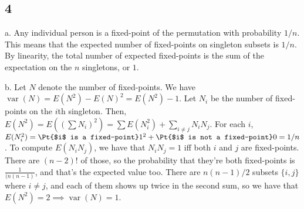 \documentclass{article}
\DeclareMathOperator{\var}{var}
\begin{document}
%
\subsection*{4}
a. Any individual person is a fixed-point of the permutation with probability $1/n$. This means that the expected number of fixed-points on singleton subsets is $1/n$. By linearity, the total number of expected fixed-points is the sum of the expectation on the $n$ singletons, or $1$.

b. Let $N$ denote the number of fixed-points. We have $\var(N)=E(N^2)-E(N)^2=E(N^2)-1$. Let $N_i$ be the number of fixed-points on the $i$th singleton. Then, $E(N^2)=E((\sum N_i)^2)=\sum E(N_i^2)+\sum_{i\neq j}N_iN_j$. For each $i$, $E(N_i^2)=\Pt{$i$ is a fixed-point}1^2+\Pt{$i$ is not a fixed-point}0=1/n$. To compute $E(N_iN_j)$, we have that $N_iN_j=1$ iff both $i$ and $j$ are fixed-points. There are $(n-2)!$ of those, so the probability that they're both fixed-points is $\frac{1}{(n(n-1)}$, and that's the expected value too. There are $n(n-1)/2$ subsets $\{i,j\}$ where $i\neq j$, and each of them shows up twice in the second sum, so we have that $E(N^2)=2\implies \var(N)=1$.
\end{document}
